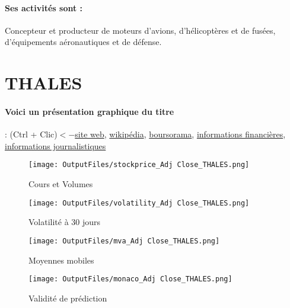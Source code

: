 \documentclass[11pt,a4paper]{report}%
\begin{document}
\paragraph{Ses activités sont : } Concepteur et producteur de moteurs d’avions, d’hélicoptères et de fusées, d’équipements aéronautiques et de défense. 
    
    \newpage

\section{THALES}

\paragraph{Voici un présentation graphique du titre} : (Ctrl + Clic)$<-$\href{https://www.thalesgroup.com/fr/investisseurs}{site web}, \href{https://fr.wikipedia.org/wiki/Thales}{wikipédia}, \href{https://www.boursorama.com/cours/1rPHO}{boursorama}, \href{https://www.qwant.com/?q=site:https:%2f%2fwww.easybourse.com%2faction-societe%2fTHALES&t=web&client=ext-firefox-hp}{informations financières}, \href{https://bourse.lerevenu.com/cours-de-bourse/fiche-valeur-synthese/THALES/HO-FR}{informations journalistiques}
\begin{figure}[!htb]
   \begin{minipage}{0.5\textwidth}
     \centering
     \texttt{[image: OutputFiles/stockprice\_Adj Close\_THALES.png]}
     \caption{Cours et Volumes}\label{Fig:price_THALES}
   \end{minipage}\hfill
   \begin{minipage}{0.5\textwidth}
     \centering
     \texttt{[image: OutputFiles/volatility\_Adj Close\_THALES.png]}
     \caption{Volatilité à 30 jours}\label{Fig:volat_THALES}
   \end{minipage}
\end{figure}
\begin{figure}[!htb]
   \begin{minipage}{0.5\textwidth}
     \centering
     \texttt{[image: OutputFiles/mva\_Adj Close\_THALES.png]}
     \caption{Moyennes mobiles}\label{Fig:mva_THALES}
   \end{minipage}\hfill
   \begin{minipage}{0.5\textwidth}
     \centering
     \texttt{[image: OutputFiles/monaco\_Adj Close\_THALES.png]}
     \caption{Validité de prédiction}\label{Fig:prediction_THALES}
   \end{minipage}
\end{figure}
\end{document}
